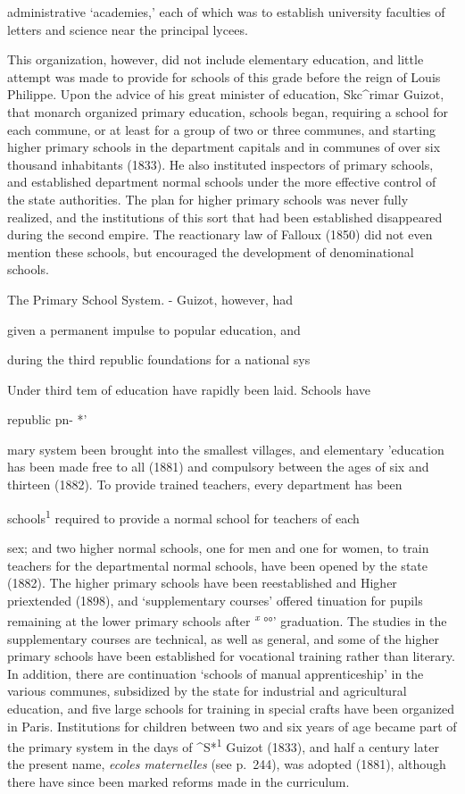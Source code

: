\documentclass[]{book}
\begin{document}
administrative `academies,' each of which was to establish university faculties of letters and science near the principal lycees.

This organization, however, did not include elementary education, and little attempt was made to provide for schools of this grade before the reign of Louis Philippe. Upon the advice of his great minister of education, Skc\^{}rimar Guizot, that monarch organized primary education, schools began, requiring a school for each commune, or at least for a group of two or three communes, and starting higher primary schools in the department capitals and in communes of over six thousand inhabitants (1833). He also instituted inspectors of primary schools, and established department normal schools under the more effective control of the state authorities. The plan for higher primary schools was never fully realized, and the institutions of this sort that had been established disappeared during the second empire. The reactionary law of Falloux (1850) did not even mention these schools, but encouraged the development of denominational schools.

The Primary School System. - Guizot, however, had

given a permanent impulse to popular education, and

during the third republic foundations for a national sys

Under third tem of education have rapidly been laid. Schools have

republic pn- *'

mary system been brought into the smallest villages, and elementary 'education has been made free to all (1881) and compulsory between the ages of six and thirteen (1882). To provide trained teachers, every department has been

schools\textsuperscript{1} required to provide a normal school for teachers of each

sex; and two higher normal schools, one for men and one for women, to train teachers for the departmental normal schools, have been opened by the state (1882).\protect\hypertarget{ch25.xmlux5cux23para.460.1.0.box.102.243.1227.901.q.60}{}{ The higher primary schools have been reestablished and Higher priextended (1898), and `supplementary courses' offered tinuation for pupils remaining at the lower primary schools after \emph{\textsuperscript{x}} °°' graduation. The studies in the supplementary courses are technical, as well as general, and some of the higher primary schools have been established for vocational training rather than literary. In addition, there are continuation `schools of manual apprenticeship' in the various communes, subsidized by the state for industrial and agricultural education, and five large schools for training in special crafts have been organized in Paris. Institutions for children between two and six years of age became part of the primary system in the days of \^{}S*\textsuperscript{1} Guizot (1833), and half a century later the present name, \emph{ecoles maternelles} (see p.~244), was adopted (1881), although there have since been marked reforms made in the curriculum.}
\end{document}
